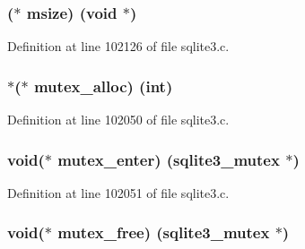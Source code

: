 \subsubsection[{msize}]{($\ast$ msize) (void $\ast$)}\label{structsqlite3__api__routines_af1044837dbbd9f43cc04104cdf509787}


Definition at line 102126 of file sqlite3.\+c.

\hypertarget{structsqlite3__api__routines_a1af4db8b3172987e3a0a7a6563236adb}{}
\subsubsection[{mutex\+\_\+alloc}]{$\ast$($\ast$ mutex\+\_\+alloc) (int)}\label{structsqlite3__api__routines_a1af4db8b3172987e3a0a7a6563236adb}


Definition at line 102050 of file sqlite3.\+c.

\hypertarget{structsqlite3__api__routines_ada638e2fd1599c0afb7a5f446a994f5e}{}
\subsubsection[{mutex\+\_\+enter}]{\setlength{\rightskip}{0pt plus 5cm}void($\ast$ mutex\+\_\+enter) ({\bf sqlite3\+\_\+mutex} $\ast$)}\label{structsqlite3__api__routines_ada638e2fd1599c0afb7a5f446a994f5e}


Definition at line 102051 of file sqlite3.\+c.

\hypertarget{structsqlite3__api__routines_a18fbbf680b1a0e6a2e14f7f3a4d7b888}{}
\subsubsection[{mutex\+\_\+free}]{\setlength{\rightskip}{0pt plus 5cm}void($\ast$ mutex\+\_\+free) ({\bf sqlite3\+\_\+mutex} $\ast$)}\label{structsqlite3__api__routines_a18fbbf680b1a0e6a2e14f7f3a4d7b888}


